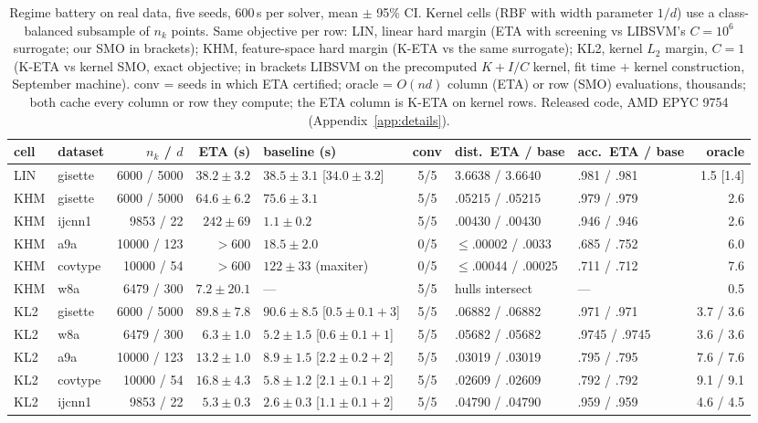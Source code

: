 \documentclass{opt2026}   %
\begin{document}
\begin{table}[t]\centering\scriptsize\setlength{\tabcolsep}{3.5pt}
\caption{Regime battery on real data, five seeds, 600\,s per solver,
mean $\pm$ 95\% CI. Kernel cells (RBF with width parameter $1/d$) use a
class-balanced subsample of $n_k$ points. Same objective per row: LIN,
linear hard margin (ETA with screening vs LIBSVM's \cite{chang2011} $C{=}10^6$
surrogate; our SMO in brackets); KHM, feature-space hard margin (K-ETA
vs the same surrogate); KL2, kernel $L_2$ margin, $C{=}1$ (K-ETA vs
kernel SMO, exact objective; in brackets LIBSVM on the precomputed
$K+I/C$ kernel, fit time $+$ kernel construction, September machine).
conv = seeds in which ETA certified; oracle = $O(nd)$ column (ETA) or
row (SMO) evaluations, thousands; both cache every column or row they
compute; the ETA column is K-ETA on kernel rows. Released code, AMD EPYC
9754 (Appendix~\ref{app:details}).}\label{tab:regime}
\begin{tabular}{llrrlcllr}
\toprule
cell & dataset & $n_k$ / $d$ & ETA (s) & baseline (s) & conv & dist.\ ETA / base & acc.\ ETA / base & oracle \\
\midrule
LIN & gisette & 6000 / 5000 & $38.2\pm3.2$ & $38.5\pm3.1$ [$34.0\pm3.2$] & 5/5 & 3.6638 / 3.6640 & .981 / .981 & 1.5 [1.4] \\
\midrule
KHM & gisette & 6000 / 5000 & $64.6\pm6.2$ & $75.6\pm3.1$ & 5/5 & .05215 / .05215 & .979 / .979 & 2.6 \\
KHM & ijcnn1 & 9853 / 22 & $242\pm69$ & $1.1\pm0.2$ & 5/5 & .00430 / .00430 & .946 / .946 & 2.6 \\
KHM & a9a & 10000 / 123 & $>600$ & $18.5\pm2.0$ & 0/5 & $\le$.00002 / .0033 & .685 / .752 & 6.0 \\
KHM & covtype & 10000 / 54 & $>600$ & $122\pm33$ (maxiter) & 0/5 & $\le$.00044 / .00025 & .711 / .712 & 7.6 \\
KHM & w8a & 6479 / 300 & $7.2\pm20.1$ & --- & 5/5 & hulls intersect & --- & 0.5 \\
\midrule
KL2 & gisette & 6000 / 5000 & $89.8\pm7.8$ & $90.6\pm8.5$ [$0.5\pm0.1+3$] & 5/5 & .06882 / .06882 & .971 / .971 & 3.7 / 3.6 \\
KL2 & w8a & 6479 / 300 & $6.3\pm1.0$ & $5.2\pm1.5$ [$0.6\pm0.1+1$] & 5/5 & .05682 / .05682 & .9745 / .9745 & 3.6 / 3.6 \\
KL2 & a9a & 10000 / 123 & $13.2\pm1.0$ & $8.9\pm1.5$ [$2.2\pm0.2+2$] & 5/5 & .03019 / .03019 & .795 / .795 & 7.6 / 7.6 \\
KL2 & covtype & 10000 / 54 & $16.8\pm4.3$ & $5.8\pm1.2$ [$2.1\pm0.1+2$] & 5/5 & .02609 / .02609 & .792 / .792 & 9.1 / 9.1 \\
KL2 & ijcnn1 & 9853 / 22 & $5.3\pm0.3$ & $2.6\pm0.3$ [$1.1\pm0.1+2$] & 5/5 & .04790 / .04790 & .959 / .959 & 4.6 / 4.5 \\
\bottomrule
\end{tabular}
\end{table}
\end{document}
